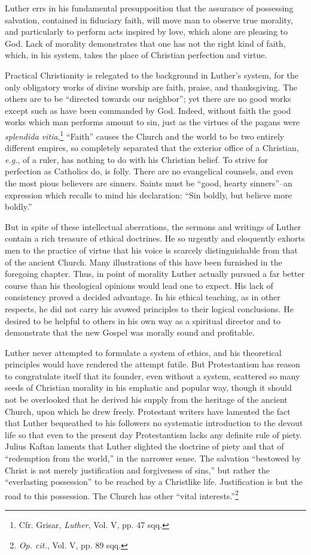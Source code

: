 Luther errs in his fundamental presupposition that the assurance
of possessing salvation, contained in fiduciary faith, will move man to
observe true morality, and particularly to perform acts inspired by
love, which alone are pleasing to God. Lack of morality demonstrates
that one has not the right kind of faith, which, in his system, takes
the place of Christian perfection and virtue.

Practical Christianity is relegated to the background in Luther’s
system, for the only obligatory works of divine worship are faith,
praise, and thanksgiving. The others are to be “directed towards our
neighbor”; yet there are no good works except such as have been commanded
by God. Indeed, without faith the good works which man
performs amount to sin, just as the virtues of the pagans were
\textit{splendida vitia}.\footnote{Cfr. Grisar, \textit{Luther}, Vol. V, pp. 47 sqq.}
“Faith” causes the Church and the world to be two
entirely different empires, so completely separated that the exterior
office of a Christian, \textit{e.g.}, of a ruler, has nothing to do with
his Christian belief. To strive for perfection as Catholics do, is folly. There are
no evangelical counsels, and even the most pious believers are sinners.
Saints must be “good, hearty sinners”--an expression which recalls to
mind his declaration: “Sin boldly, but believe more boldly.”

But in spite of these intellectual aberrations, the sermons and writings
of Luther contain a rich treasure of ethical doctrines. He so
urgently and eloquently exhorts men to the practice of virtue that
his voice is scarcely distinguishable from that of the ancient Church.
Many illustrations of this have been furnished in the foregoing chapter.
Thus, in point of morality Luther actually pursued a far better
course than his theological opinions would lead one to expect. His
lack of consistency proved a decided advantage. In his ethical teaching,
as in other respects, he did not carry his avowed principles to
their logical conclusions. He desired to be helpful to others in his own
way as a spiritual director and to demonstrate that the new Gospel
was morally sound and profitable.

Luther never attempted to formulate a system of ethics, and his theoretical
principles would have rendered the attempt futile. But Protestantism has reason
to congratulate itself that its founder, even without a system, scattered so
many seeds of Christian morality in his emphatic and popular way, though it
should not be overlooked that he derived his supply from the heritage of the
ancient Church, upon which he drew freely. Protestant writers have lamented the
fact that Luther bequeathed to his followers no systematic introduction to the
devout life so that even to the present day Protestantism lacks any definite
rule of piety. Julius Kaftan laments that Luther slighted the doctrine of piety
and that of “redemption from the world,” in the narrower sense. The salvation
“bestowed by Christ is not merely justification and forgiveness of sins,” but
rather the “everlasting possession” to be reached by a Christlike life.
Justification is but the road to this possession. The Church has other “vital
interests.”\footnote{\textit{Op. cit.}, Vol. V, pp. 89 sqq.}

